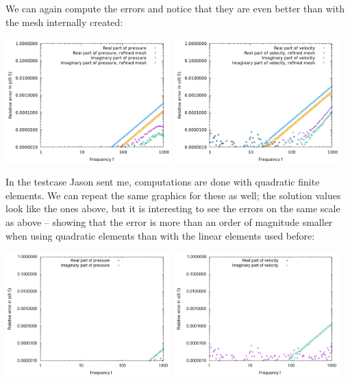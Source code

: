 \documentclass{article}
\begin{document}
We can again compute the errors and notice that they are even better
than with the mesh internally created:
\begin{center}
\includegraphics[width=0.48\textwidth]{wave-guide-tet-real-material-jasons-mesh-0/error-pressure-at-center.png}
\includegraphics[width=0.48\textwidth]{wave-guide-tet-real-material-jasons-mesh-0/error-velocity-at-center.png}
\end{center}

In the testcase Jason sent me, computations are done with quadratic
finite elements. We can repeat the same graphics for these as well;
the solution values look like the ones above, but it is interesting to
see the errors on the same scale as above -- showing that the error is
more than an order of magnitude smaller when using quadratic elements than
with the linear elements used before:
\begin{center}
\includegraphics[width=0.48\textwidth]{wave-guide-tet-real-material-jasons-mesh-0-quadratic/error-pressure-at-center.png}
\includegraphics[width=0.48\textwidth]{wave-guide-tet-real-material-jasons-mesh-0-quadratic/error-velocity-at-center.png}
\end{center}
\end{document}
